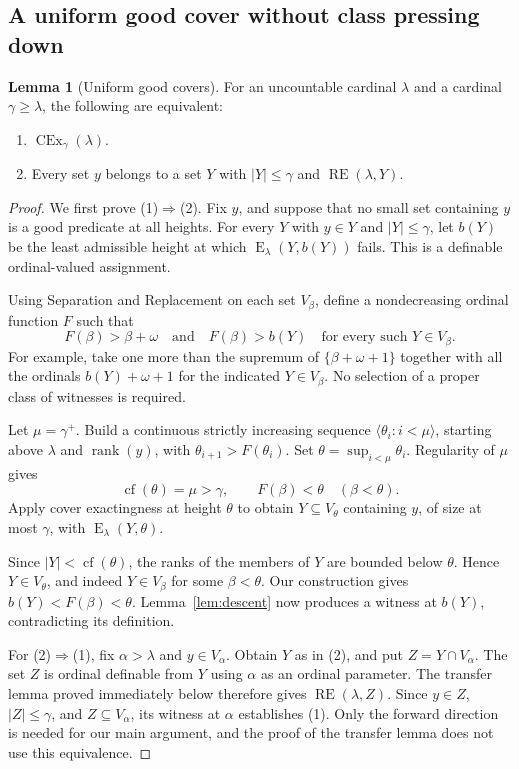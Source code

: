 \documentclass[11pt,letterpaper]{article}
\theoremstyle{definition}
\newtheorem{lemma}[definition]{Lemma}
\newcommand{\CEx}{\operatorname{CEx}}
\newcommand{\cf}{\operatorname{cf}}
\newcommand{\rank}{\operatorname{rank}}
\newcommand{\RE}{\operatorname{RE}}
\newcommand{\Erel}{\operatorname{E}}
\begin{document}
\subsection{A uniform good cover without class pressing down}

\begin{lemma}[Uniform good covers]\label{lem:uniform}
For an uncountable cardinal $\lambda$ and a cardinal $\gamma\ge\lambda$, the following are equivalent:
\begin{enumerate}
\item $\CEx_\gamma(\lambda)$.
\item Every set $y$ belongs to a set $Y$ with $|Y|\le\gamma$ and $\RE(\lambda,Y)$.
\end{enumerate}
\end{lemma}
\begin{proof}
We first prove (1)$\Rightarrow$(2). Fix $y$, and suppose that no small set containing $y$ is a good predicate at all heights. For every $Y$ with $y\in Y$ and $|Y|\le\gamma$, let $b(Y)$ be the least admissible height at which $\Erel_\lambda(Y,b(Y))$ fails. This is a definable ordinal-valued assignment.

Using Separation and Replacement on each set $V_\beta$, define a nondecreasing ordinal function $F$ such that
\[
F(\beta)>\beta+\omega
\quad\text{and}\quad
F(\beta)>b(Y)
\quad\text{for every such }Y\in V_\beta.
\]
For example, take one more than the supremum of $\{\beta+\omega+1\}$ together with all the ordinals $b(Y)+\omega+1$ for the indicated $Y\in V_\beta$. No selection of a proper class of witnesses is required.

Let $\mu=\gamma^+$. Build a continuous strictly increasing sequence $\langle\theta_i:i<\mu\rangle$, starting above $\lambda$ and $\rank(y)$, with $\theta_{i+1}>F(\theta_i)$. Set $\theta=\sup_{i<\mu}\theta_i$. Regularity of $\mu$ gives
\[
\cf(\theta)=\mu>\gamma,
\qquad F(\beta)<\theta\quad(\beta<\theta).
\]
Apply cover exactingness at height $\theta$ to obtain $Y\subseteq V_\theta$ containing $y$, of size at most $\gamma$, with $\Erel_\lambda(Y,\theta)$.

Since $|Y|<\cf(\theta)$, the ranks of the members of $Y$ are bounded below $\theta$. Hence $Y\in V_\theta$, and indeed $Y\in V_\beta$ for some $\beta<\theta$. Our construction gives $b(Y)<F(\beta)<\theta$. Lemma~\ref{lem:descent} now produces a witness at $b(Y)$, contradicting its definition.

For (2)$\Rightarrow$(1), fix $\alpha>\lambda$ and $y\in V_\alpha$. Obtain $Y$ as in (2), and put $Z=Y\cap V_\alpha$. The set $Z$ is ordinal definable from $Y$ using $\alpha$ as an ordinal parameter. The transfer lemma proved immediately below therefore gives $\RE(\lambda,Z)$. Since $y\in Z$, $|Z|\le\gamma$, and $Z\subseteq V_\alpha$, its witness at $\alpha$ establishes (1). Only the forward direction is needed for our main argument, and the proof of the transfer lemma does not use this equivalence.
\end{proof}
\end{document}
